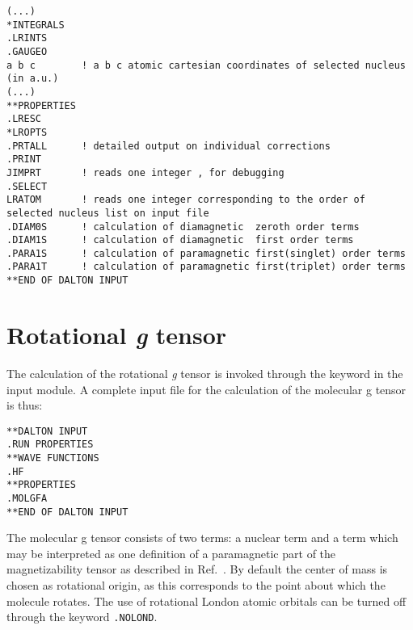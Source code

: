 \begin{verbatim}
(...)
*INTEGRALS
.LRINTS
.GAUGEO 
a b c        ! a b c atomic cartesian coordinates of selected nucleus (in a.u.)
(...)
**PROPERTIES
.LRESC
*LROPTS
.PRTALL      ! detailed output on individual corrections
.PRINT
JIMPRT       ! reads one integer , for debugging
.SELECT
LRATOM       ! reads one integer corresponding to the order of selected nucleus list on input file 
.DIAM0S      ! calculation of diamagnetic  zeroth order terms
.DIAM1S      ! calculation of diamagnetic  first order terms
.PARA1S      ! calculation of paramagnetic first(singlet) order terms
.PARA1T      ! calculation of paramagnetic first(triplet) order terms
**END OF DALTON INPUT
\end{verbatim}






\section{Rotational {\em g} tensor}\label{sec:gfac}

\begin{center}
\end{center}

The calculation of the rotational  {\em g} tensor is invoked through the
keyword  in the  input module. A complete
input file for the calculation of the molecular g tensor is thus:

\begin{verbatim}
**DALTON INPUT
.RUN PROPERTIES
**WAVE FUNCTIONS
.HF
**PROPERTIES
.MOLGFA
**END OF DALTON INPUT
\end{verbatim}

The molecular g tensor consists of two terms: a nuclear term and a
term which may be interpreted as one definition of a paramagnetic part
of the magnetizability tensor as
described in Ref.~\cite{jgkrthjcp105}.
By default the center of mass is chosen as
rotational origin, as this corresponds to the point about which the
molecule rotates. The use of
rotational London atomic
orbitals can be turned off through
the keyword \verb|.NOLOND|.

